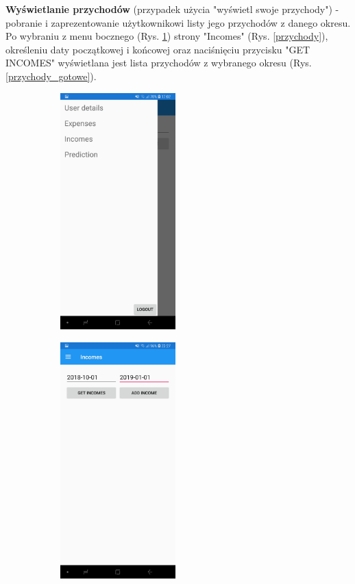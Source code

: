 \textbf{Wyświetlanie przychodów} (przypadek użycia "wyświetl swoje przychody") - pobranie i zaprezentowanie użytkownikowi listy jego przychodów z danego okresu. Po wybraniu z menu bocznego (Rys. \ref{hamburger_przychody}) strony "Incomes" (Rys. \ref{przychody}), określeniu daty początkowej i końcowej oraz naciśnięciu przycisku "GET INCOMES" wyświetlana jest lista przychodów z wybranego okresu (Rys. \ref{przychody_gotowe}).
\begin{figure}[!ht]
	\begin{center}
		\begin{subfigure}[b]{0.3\textwidth}
			\includegraphics[width=1.75in]{img/mobile/menu_boczne.jpg}
			\label{hamburger_przychody}
		\end{subfigure}
		\begin{subfigure}[b]{0.3\textwidth}
			\includegraphics[width=1.75in]{img/mobile/przychody.jpg}

\end{subfigure}
\end{center}
\end{figure}
